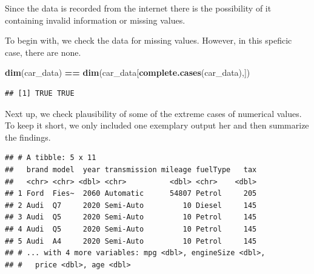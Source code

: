 \documentclass[sigchi]{acmart}
\newenvironment{Shaded}{\begin{snugshade}}{\end{snugshade}}
\newcommand{\CommentTok}[1]{\textcolor[rgb]{0.56,0.35,0.01}{\textit{#1}}}
\newcommand{\DataTypeTok}[1]{\textcolor[rgb]{0.13,0.29,0.53}{#1}}
\newcommand{\DecValTok}[1]{\textcolor[rgb]{0.00,0.00,0.81}{#1}}
\newcommand{\KeywordTok}[1]{\textcolor[rgb]{0.13,0.29,0.53}{\textbf{#1}}}
\newcommand{\NormalTok}[1]{#1}
\newcommand{\OperatorTok}[1]{\textcolor[rgb]{0.81,0.36,0.00}{\textbf{#1}}}
\newcommand{\StringTok}[1]{\textcolor[rgb]{0.31,0.60,0.02}{#1}}
\begin{document}
Since the data is recorded from the internet there is the possibility of it containing invalid information or missing values.

To begin with, we check the data for missing values. However, in this speficic case, there are none.

\begin{Shaded}
\begin{Highlighting}[]
\KeywordTok{dim}\NormalTok{(car_data) }\OperatorTok{==}
\StringTok{  }\KeywordTok{dim}\NormalTok{(car_data[}\KeywordTok{complete.cases}\NormalTok{(car_data),])}
\end{Highlighting}
\end{Shaded}

\begin{verbatim}
## [1] TRUE TRUE
\end{verbatim}

Next up, we check plausibility of some of the extreme cases of numerical values. To keep it short, we only included one exemplary output her and then summarize the findings.

\begin{Shaded}
\end{Shaded}

\begin{verbatim}
## # A tibble: 5 x 11
##   brand model  year transmission mileage fuelType   tax
##   <chr> <chr> <dbl> <chr>          <dbl> <chr>    <dbl>
## 1 Ford  Fies~  2060 Automatic      54807 Petrol     205
## 2 Audi  Q7     2020 Semi-Auto         10 Diesel     145
## 3 Audi  Q5     2020 Semi-Auto         10 Petrol     145
## 4 Audi  Q5     2020 Semi-Auto         10 Petrol     145
## 5 Audi  A4     2020 Semi-Auto         10 Petrol     145
## # ... with 4 more variables: mpg <dbl>, engineSize <dbl>,
## #   price <dbl>, age <dbl>
\end{verbatim}

\begin{Shaded}
\end{Shaded}
\end{document}
